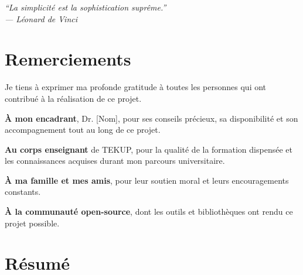 \documentclass[12pt,a4paper]{report}
\begin{document}
\cleardoublepage
\thispagestyle{empty}
\vspace*{3cm}
\begin{center}
    {\Large\itshape\color{secondary}
    ``La simplicité est la sophistication suprême.''\\[0.5cm]
    --- Léonard de Vinci}
\end{center}

\cleardoublepage
\chapter*{Remerciements}

Je tiens à exprimer ma profonde gratitude à toutes les personnes qui ont contribué à la réalisation de ce projet.

\vspace{0.5cm}

\noindent\textbf{À mon encadrant}, Dr. [Nom], pour ses conseils précieux, sa disponibilité et son accompagnement tout au long de ce projet.

\vspace{0.3cm}

\noindent\textbf{Au corps enseignant} de TEKUP, pour la qualité de la formation dispensée et les connaissances acquises durant mon parcours universitaire.

\vspace{0.3cm}

\noindent\textbf{À ma famille et mes amis}, pour leur soutien moral et leurs encouragements constants.

\vspace{0.3cm}

\noindent\textbf{À la communauté open-source}, dont les outils et bibliothèques ont rendu ce projet possible.

\cleardoublepage
\chapter*{Résumé}
\end{document}
